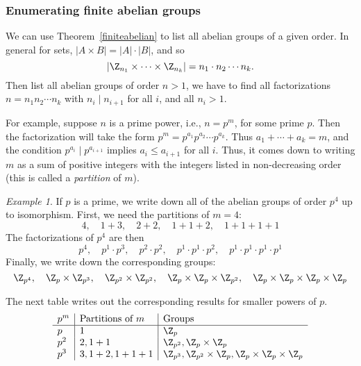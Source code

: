 \documentclass[12pt]{amsart}
\theoremstyle{plain}
\theoremstyle{definition}
\theoremstyle{remark}
\newtheorem*{exam}{Example}
\begin{document}
\subsubsection{Enumerating finite abelian groups}

We can use Theorem~\ref{finiteabelian} to list all abelian groups of a
given order.  In general for sets, $|A\times B|=|A|\cdot|B|$, and so
\[ |\Z_{n_1}\times\cdots\times \Z_{n_k}| = n_1\cdot n_2 \cdots n_k .\]
Then list all abelian groups of order $n>1$, we have to find all factorizations
$n=n_1n_2\cdots n_k$ with $n_i\mid n_{i+1}$ for all $i$, and all $n_i>1$.

For example, suppose $n$ is a prime power, i.e., $n=p^m$, for some prime $p$.  
Then the factorization will
take the form $p^m = p^{a_1}p^{a_2}\cdots p^{a_k}$.  Thus $a_1+\cdots+a_k = m$,
and the condition $p^{a_i}\mid p^{a_{i+1}}$ implies $a_i\leq a_{i+1}$
for all $i$. 
Thus, it comes down to writing $m$ as a sum of positive integers with the
integers listed in non-decreasing order (this is called a {\em
  partition} of $m$). 

\begin{exam}
  If $p$ is a prime, we write down all of the abelian groups of order $p^4$ up to
  isomorphism.  First, we need the partitions of $m=4$:
\[ 4,\quad 1+3,\quad 2+2,\quad 1+1+2,\quad 1+1+1+1\]
  The factorizations of $p^4$ are then
\[ p^4,\quad p^1\cdot p^3,\quad p^2\cdot p^2,\quad p^1\cdot p^1\cdot p^2,
\quad p^1\cdot p^1\cdot p^1\cdot p^1\]
  Finally, we write down the corresponding groups:
\[ \Z_{p^4},\quad \Z_p\times \Z_{p^3},\quad \Z_{p^2}\times\Z_{p^2},\quad 
\Z_p\times\Z_p\times \Z_{p^2},\quad \Z_p\times\Z_p\times\Z_p\times\Z_p\]
\end{exam}

The next table writes out the corresponding results for smaller powers of $p$.
\[ \begin{array}{l|l|l}
p^m & \text{Partitions of $m$} & \text{Groups} \\ \hline
p & 1 &\Z_p \\
p^2 & 2, 1+1 &\Z_{p^2}, \Z_p\times \Z_p \\
p^3 & 3, 1+2, 1+1+1 &\Z_{p^3}, \Z_{p^2}\times\Z_p, \Z_p\times \Z_p\times\Z_p
\end{array} \]
\end{document}
